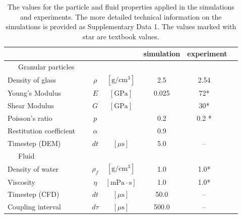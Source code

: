 \documentclass[twoside,twocolumn,9pt]{article}
\providecommand{\DIFaddbegin}{} %
\providecommand{\DIFaddend}{} %
\providecommand{\DIFdelbegin}{} %
\providecommand{\DIFdelend}{} %
\newcommand{\DIFscaledelfig}{0.5}
\newlength{\DIFdelgraphicswidth} %
\newlength{\DIFdelgraphicsheight} %
\newcommand{\DIFaddincludegraphics}[2][]{{\color{blue}\fbox{\DIFOincludegraphics[#1]{#2}}}} %
\newcommand{\DIFdelincludegraphics}[2][]{%
\sbox{\DIFdelgraphicsbox}{\DIFOincludegraphics[#1]{#2}}%
\settoboxwidth{\DIFdelgraphicswidth}{\DIFdelgraphicsbox} %
\settoboxtotalheight{\DIFdelgraphicsheight}{\DIFdelgraphicsbox} %
\scalebox{\DIFscaledelfig}{%
\parbox[b]{\DIFdelgraphicswidth}{\usebox{\DIFdelgraphicsbox}\\[-\baselineskip] \rule{\DIFdelgraphicswidth}{0em}}\llap{\resizebox{\DIFdelgraphicswidth}{\DIFdelgraphicsheight}{%
\setlength{\unitlength}{\DIFdelgraphicswidth}%
\begin{picture}(1,1)%
\thicklines\linethickness{2pt} %
{\color[rgb]{1,0,0}\put(0,0){\framebox(1,1){}}}%
{\color[rgb]{1,0,0}\put(0,0){\line( 1,1){1}}}%
{\color[rgb]{1,0,0}\put(0,1){\line(1,-1){1}}}%
\end{picture}%
}\hspace*{3pt}}} %
} %
\DeclareRobustCommand{\DIFaddbegin}{\DIFOaddbegin \let\includegraphics\DIFaddincludegraphics} %
\DeclareRobustCommand{\DIFaddend}{\DIFOaddend \let\includegraphics\DIFOincludegraphics} %
\DeclareRobustCommand{\DIFdelbegin}{\DIFOdelbegin \let\includegraphics\DIFdelincludegraphics} %
\DeclareRobustCommand{\DIFdelend}{\DIFOaddend \let\includegraphics\DIFOincludegraphics} %
\begin{document}
\DIFdelbegin %
\DIFdelend \DIFaddbegin \begin{table}[!b]
\caption{The values for the particle and fluid properties applied in the simulations and experiments. The more detailed technical information on the simulations is provided as  Supplementary Data 1. The values marked with star are textbook values.}\label{tab:properties}
\setlength{\extrarowheight}{2pt}
  \begin{tabular*}{0.5\textwidth}{@{\extracolsep{\fill}}lccccc}

 \hline
 & & &	simulation		& experiment \\
    \hline
~~~Granular particles~~~	&\\[2pt]
\hline
Density of glass 				& $\rho$			& $\mathrm{[g/cm^3]}$		& 2.5 					& 2.54	~\\
Young's Modulus 			& $E$				& $\mathrm{[GPa]}$			&	0.025				& 72*	~\\
Shear Modulus 				& $G$ 				& $\mathrm{[GPa]}$			& \textendash	& 30*	~\\
Poisson's ratio					& $p$				&														& 0.2						& 0.2	*	~\\ 
Restitution coefficient	& $\alpha$		&														& 0.9   					& \textendash ~\\
Timestep (DEM) 			& $dt$				& $[\mu\mathrm{s}]$			&	5.0				& --	~\\
\hline
~~~Fluid~~~	&\\[2pt]
\hline
Density of water				& $\rho_f$		& $\mathrm{[g/cm^3]}$			& 1.0 				& 1.0* ~\\
Viscosity								& $\eta$			& $\mathrm{[mPa\cdot s]}$	& 1.0					& 1.0* ~\\
Timestep (CFD)								& $dt$			& $[\mu\mathrm{s}]$	& 50.0					& -- ~\\
Coupling interval								& $d\tau$			& $[\mu\mathrm{s}]$	& 500.0					& -- ~\\
\hline
\end{tabular*}

\end{table}
\DIFaddend 
\end{document}
